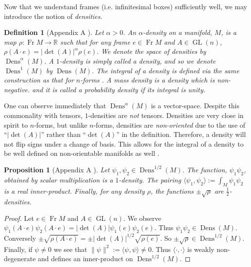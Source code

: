 \documentclass[letterpaper, 10 pt, conference]{ieeeconf}
\newcommand{\R}{\mathbb{R}}
\newtheorem{defn}[thm]{Definition}
\newtheorem{prop}[thm]{Proposition}
\DeclareMathOperator{\Fr}{Fr}
\DeclareMathOperator{\GL}{GL}
\DeclareMathOperator{\Dens}{Dens}
\begin{document}
  Now that we understand frames (i.e. infinitesimal boxes)
  sufficiently well, we may introduce the notion of \emph{densities}.

  \begin{defn}[Appendix A \cite{BatesWeinstein1997}]
    \label{eq:density}
    Let $\alpha > 0$.
    An $\alpha$-\emph{density} on a manifold, $M$, is a map
    $\rho:\Fr M \to \R$ such that
    for any frame $e \in \Fr M$ and $A \in \GL(n)$,
    $
      \rho( A \cdot e ) =  | \det(A) |^\alpha \rho(e).
    $
    We denote the space of densities by $\Dens^\alpha(M)$.
    A $1$-density is simply called a \emph{density}, and
    so we denote $\Dens^1(M)$ by $\Dens(M)$.
    The integral of a density is defined via the same construction as that
    for $n$-forms \cite[Ch. 14]{Lee2006}.
    A \emph{mass density} is a density which is non-negative.
    and it is called a \emph{probability density} if its integral is
    unity.
  \end{defn}

  One can observe immediately that $\Dens^\alpha(M)$ is a vector-space.
  Despite this commonality with tensors,
  $1$-densities are \emph{not} tensors.
  Densities are very close in spirit to $n$-forms,
  but unlike $n$-forms, densities are \emph{non-oriented}
  due to the use of ``$|\det(A)|$'' rather than ``$\det(A)$'' 
  in the definition.
  Therefore, a density will not flip signs under a change of basis.
  This allows for the integral of a density to be well defined
  on non-orientable manifolds as well \cite[Ch. 14]{Lee2006}.

  \begin{prop}[Appendix A \cite{BatesWeinstein1997}]
    Let $\psi_1,\psi_2 \in \Dens^{1/2}(M)$.
    The function, $\psi_1 \psi_2$, obtained by
    scalar multiplication is a $1$-density.
    The pairing
    $
    \langle \psi_1, \psi_2 \rangle := \int_M \psi_1 \psi_2 
    $
    is a real inner-product.
    Finally, for any density $\rho$, the functions $\pm\sqrt{\rho}$ are
    $\frac{1}{2}$-densities.
  \end{prop}
  \begin{proof}
    Let $e \in \Fr M$ and $A \in \GL(n)$.
    We observe $\psi_1(A \cdot e) \psi_2(A \cdot e) = |\det(A) | \psi_1(e) \psi_2(e)$.  Thus $\psi_1 \psi_2 \in \Dens(M)$.
    Conversely $\pm \sqrt{\rho( A \cdot e)} = \pm | \det(A) |^{1/2} \sqrt{ \rho(e)}$. So $\pm \sqrt{\rho} \in \Dens^{1/2}(M)$.
    Finally, if $\psi \neq 0$ we see that $\| \psi \|^2 := \langle \psi , \psi \rangle \neq 0$.
    Thus $\langle \cdot , \cdot \rangle$ is weakly non-degenerate
    and defines an inner-product on $\Dens^{1/2}(M)$.
  \end{proof}
\end{document}
